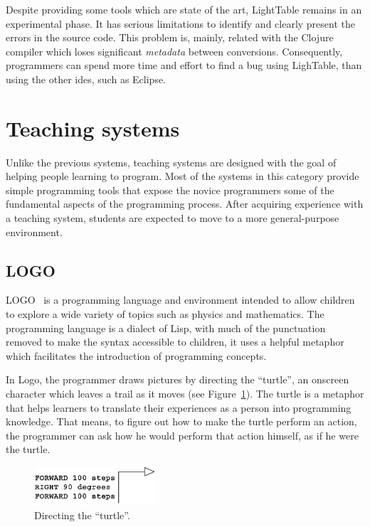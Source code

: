 Despite providing some tools which are state of the art, LightTable remains in an experimental phase. It has serious limitations to identify and clearly present the errors in the source code. This problem is, mainly, related with the Clojure compiler which loses significant \textit{metadata} between conversions. Consequently, programmers can spend more time and effort to find a bug using LighTable, than using the other \glspl{ide}, such as Eclipse.
\section{Teaching systems}
\label{sec:ts}
Unlike the previous systems, teaching systems are designed with the goal of helping people learning to program. Most of the systems in this category provide simple programming tools that expose the novice programmers some of the fundamental aspects of the programming process. After acquiring experience with a teaching system, students are expected to move to a more general-purpose environment. 

\subsection{LOGO} 
\label{subsec:logo}
LOGO~\cite{papert1980mindstorms} is a programming language and environment intended to allow children to explore a wide variety of topics such as physics and mathematics. The programming language is a dialect of Lisp, with much of the punctuation removed to make the syntax accessible to children, it uses a helpful metaphor which facilitates the introduction of programming concepts.

In Logo, the programmer draws pictures by directing the ``turtle'', an onscreen character which leaves a trail as it moves (see Figure~\ref{fig:turtle}). The turtle is a metaphor that helps learners to translate their experiences as a person into programming knowledge. That means, to figure out how to make the turtle perform an action, the programmer can ask how he would perform that action himself, as if he were the turtle.

\begin{figure}
  \begin{center}
    \includegraphics[width=0.4\textwidth]{images/turtle}
  \end{center}
 \caption{Directing the ``turtle''.}  
    \label{fig:turtle}
\end{figure}

